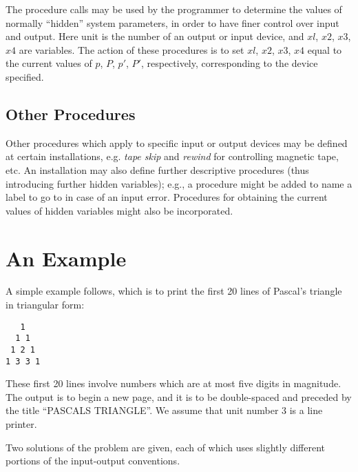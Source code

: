 \documentclass[a4paper,11pt]{article}
\begin{document}
The procedure calls
\noindent{}may be used by the programmer to determine the values of
normally ``hidden'' system parameters, in order to have finer control
over input and output.  Here unit is the number of an output or input
device, and $xl$, $x2$, $x3$, $x4$ are variables.  The action of these
procedures is to set $xl$, $x2$, $x3$, $x4$ equal to the current
values of $p$, $P$, $p'$, $P'$, respectively, corresponding to the
device specified.

\subsection{Other Procedures}
\label{Lbl++IoProc+Other}

Other procedures which apply to specific input or output devices may
be defined at certain installations, e.g. {\it tape skip} and {\it
rewind} for controlling magnetic tape, etc.  An installation may also
define further descriptive procedures (thus introducing further hidden
variables); e.g., a procedure might be added to name a label to go to
in case of an input error.  Procedures for obtaining the current
values of hidden variables might also be incorporated.



\section{An Example}

A simple example follows, which is to print the first 20 lines of
Pascal's triangle in triangular form:

\begin{verbatim}
   1
  1 1
 1 2 1
1 3 3 1
\end{verbatim}

These first 20 lines involve numbers which are at most five digits in
magnitude.  The output is to begin a new page, and it is to be
double-spaced and preceded by the title ``PASCALS TRIANGLE''.  We
assume that unit number 3 is a line printer.

Two solutions of the problem are given, each of which uses slightly
different portions of the input-output conventions.
\end{document}
